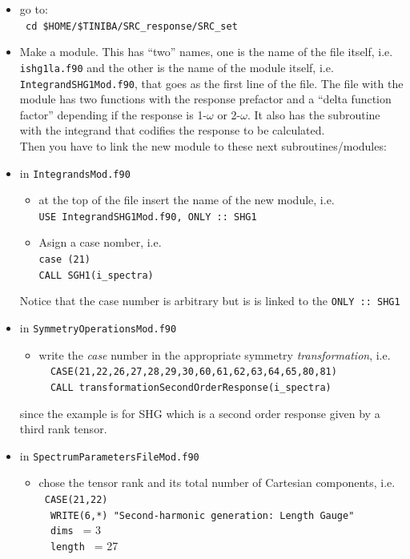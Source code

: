 \documentclass[openany,oneside]{book}
\numberwithin{equation}{section}
\begin{document}
\begin{itemize}
\item go to:\\
\verb= cd $HOME/$TINIBA/SRC_response/SRC_set=  
\item Make a module. This has ``two'' names, one is the name of the
  file itself,
i.e. \verb=ishg1la.f90=
and the other is the name of the module itself,
i.e. \verb=IntegrandSHG1Mod.f90=,
 that goes as the first
line of the file.
The file with the module has two functions with the
response prefactor and a ``delta function factor'' depending if the
response is 1-$\omega$ or 2-$\omega$. It also has the subroutine with
the integrand that codifies the response to be calculated.\\
Then you have to link the new module to these next subroutines/modules: 

\item in \verb=IntegrandsMod.f90=
   \begin{itemize}
   \item at the top of the file insert the
     name of the new module, i.e. \\ \verb=USE IntegrandSHG1Mod.f90, ONLY :: SHG1= 
   \item Asign a case nomber, i.e.\\
     \verb=case (21)=\\
     \verb=CALL SGH1(i_spectra)=
   \end{itemize}
Notice that the case number is arbitrary but is is linked to the
\verb=ONLY :: SHG1= 

\item in \verb=SymmetryOperationsMod.f90=

\begin{itemize}

\item write the {\it case} number in the appropriate symmetry {\it transformation},
i.e. \\
\verb=  CASE(21,22,26,27,28,29,30,60,61,62,63,64,65,80,81)=\\
\verb=  CALL transformationSecondOrderResponse(i_spectra)=
     \end{itemize}
since the example is for SHG which is a second order response given by a third rank tensor.

\item in \verb=SpectrumParametersFileMod.f90=
      \begin{itemize}
      \item chose the tensor rank and its total number of Cartesian
        components, i.e.\\
\verb= CASE(21,22)= \\
\verb=  WRITE(6,*) "Second-harmonic generation: Length Gauge"=\\
\verb=  dims = = 3\\
\verb=  length = = 27
     \end{itemize}


\end{itemize}
\end{document}
